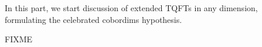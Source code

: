 In this part, we start discussion of extended TQFTs in
any dimension, formulating the celebrated cobordims hypothesis.

FIXME